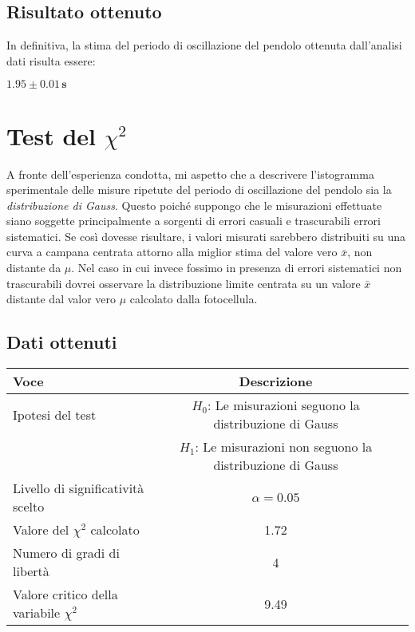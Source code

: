 \documentclass{article}
\begin{document}
\subsection{Risultato ottenuto}
In definitiva, la stima del periodo di oscillazione del pendolo ottenuta dall'analisi dati risulta essere: 
\begin{center}
$\mathbf{1.95 \pm 0.01 \, \text{s}}$
\end{center}

\section{Test del $\chi^2$}
A fronte dell'esperienza condotta, mi aspetto che a descrivere l'istogramma sperimentale delle misure ripetute del periodo di oscillazione del pendolo sia la \textit{distribuzione di Gauss}.\newline
Questo poiché suppongo che le misurazioni effettuate siano soggette principalmente a sorgenti di errori casuali e trascurabili errori sistematici. Se così dovesse risultare, i valori misurati sarebbero distribuiti su una curva a campana centrata attorno alla miglior stima del valore vero $\bar{x}$, non distante da $\mu$. \newline 
Nel caso in cui invece fossimo in presenza di errori sistematici non trascurabili dovrei osservare la distribuzione limite centrata su un valore $\bar{x}$ distante dal valor vero $\mu$ calcolato dalla fotocellula.
\newline
\subsection{Dati ottenuti}
\begin{table}[ht]
\centering
{}
\begin{tabular}{|l|c|p{10cm}|}
\hline
\textbf{Voce} & \textbf{Descrizione} \\
\hline
Ipotesi del test & \textbf{\(H_0\)}: Le misurazioni seguono la distribuzione di Gauss \\
                & \textbf{\(H_1\)}: Le misurazioni non seguono la distribuzione di Gauss \\
\hline
Livello di significatività scelto & $\alpha = 0.05$ \\
\hline
Valore del $\chi^2$ calcolato & 1.72 \\
\hline
Numero di gradi di libertà & 4 \\
\hline
Valore critico della variabile $\chi^2$ & 9.49 \\
\hline
\end{tabular}
\label{tab:chi_quadro_test}
\end{table}
\end{document}
